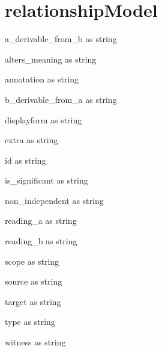 \section{relationshipModel}
\begin{property}
a\_derivable\_from\_b as string
\end{property}
\begin{property}
alters\_meaning as string
\end{property}
\begin{property}
annotation as string
\end{property}
\begin{property}
b\_derivable\_from\_a as string
\end{property}
\begin{property}
displayform as string
\end{property}
\begin{property}
extra as string
\end{property}
\begin{property}
id as string
\end{property}
\begin{property}
is\_significant as string
\end{property}
\begin{property}
non\_independent as string
\end{property}
\begin{property}
reading\_a as string
\end{property}
\begin{property}
reading\_b as string
\end{property}
\begin{property}
scope as string
\end{property}
\begin{property}
source as string
\end{property}
\begin{property}
target as string
\end{property}
\begin{property}
type as string
\end{property}
\begin{property}
witness as string
\end{property}

